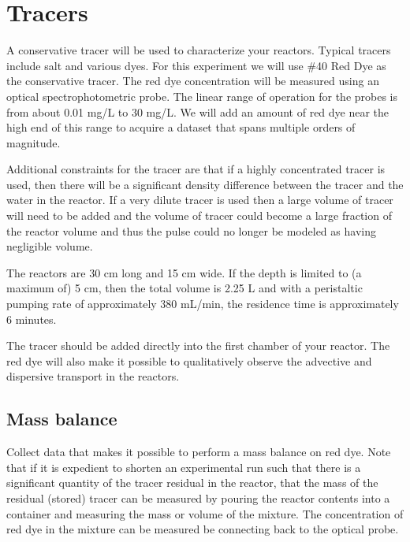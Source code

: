 \documentclass[letterpaper,10pt,english]{sphinxmanual}
\begin{document}
\section{Tracers}
\label{\detokenize{Reactor_Characteristics/Reactor_Characteristics:tracers}}\label{\detokenize{Reactor_Characteristics/Reactor_Characteristics:heading-reactor-tracers}}
A conservative tracer will be used to characterize your reactors. Typical tracers include salt and various dyes. For this experiment we will use \#40 Red Dye as the conservative tracer. The red dye concentration will be measured using an optical spectrophotometric probe. The linear range of operation for the probes is from about 0.01 mg/L to 30 mg/L. We will add an amount of red dye near the high end of this range to acquire a dataset that spans multiple orders of magnitude.

Additional constraints for the tracer are that if a highly concentrated tracer is used, then there will be a significant density difference between the tracer and the water in the reactor. If a very dilute tracer is used then a large volume of tracer will need to be added and the volume of tracer could become a large fraction of the reactor volume and thus the pulse could no longer be modeled as having negligible volume.

The reactors are 30 cm long and 15 cm wide. If the depth is limited to (a maximum of) 5 cm, then the total volume is 2.25 L and with a peristaltic pumping rate of approximately 380 mL/min, the residence time is approximately 6 minutes.

The tracer should be added directly into the first chamber of your reactor. The red dye will also make it possible to qualitatively observe the advective and dispersive transport in the reactors.


\subsection{Mass balance}
\label{\detokenize{Reactor_Characteristics/Reactor_Characteristics:mass-balance}}
Collect data that makes it possible to perform a mass balance on red dye. Note that if it is expedient to shorten an experimental run such that there is a significant quantity of the tracer residual in the reactor, that the mass of the residual (stored) tracer can be measured by pouring the reactor contents into a container and measuring the mass or volume of the mixture. The concentration of red dye in the mixture can be measured be connecting back to the optical probe.
\end{document}
